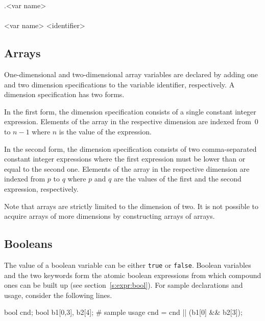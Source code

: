 \documentclass[a4paper,11pt,titlepage,english]{article}
\begin{document}
\begin{bnfgrammar}
[variable] 
    .<var name>
    \\
[array idx]  \\
<var name> \is <identifier> \\
\end{bnfgrammar}

\subsection{Arrays}

One-dimensional and two-dimensional array variables are declared by adding
one and two dimension specifications to the variable identifier,
respectively. A dimension specification has two forms. 

In the first form, the dimension specification consists of a single
constant integer expression. Elements of the array in the respective
dimension are indexed from~$0$ to $n-1$ where $n$ is the value of the
expression. 

In the second form, the dimension specification consists of two
comma-separated constant integer expressions where the first expression
must be lower than or equal to the second one. Elements of the array in the
respective dimension are indexed from $p$ to $q$ where  $p$ and $q$ are the
values of the first and the second expression, respectively.


Note that arrays are strictly limited to the dimension of two. It is not
possible to acquire arrays of more dimensions by constructing arrays of
arrays.

\subsection{Booleans\label{s:data:bool}}

The value of a boolean variable can be either \verb|true| or \verb|false|.
Boolean variables and the two keywords form the atomic boolean expressions
from which compound ones can be built up (see section~\ref{s:expr:bool}).
For sample declarations and usage, consider the following lines.

\begin{RemoplaSnippet}
    bool cnd;
    bool b1[0,3], b2[4];
    # sample usage
    cnd = cnd || (b1[0] && b2[3]);
\end{RemoplaSnippet}
\end{document}
